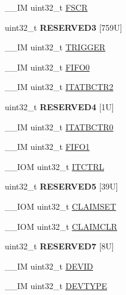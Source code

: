 \begin{DoxyCompactItemize}
\+\_\+\+\_\+\+IM uint32\+\_\+t \hyperlink{struct_t_p_i___type_a36370b2b0879b7b497f6dd854ba02873}{F\+S\+CR}
\item 
\mbox{\label{struct_t_p_i___type_a650f89ad335eff97db39beae568590a3}} 
uint32\+\_\+t {\bfseries R\+E\+S\+E\+R\+V\+E\+D3} \mbox{[}759\+U\mbox{]}
\item 
\+\_\+\+\_\+\+IM uint32\+\_\+t \hyperlink{struct_t_p_i___type_a5590387d8f44b477fd69951a737b0d7e}{T\+R\+I\+G\+G\+ER}
\item 
\+\_\+\+\_\+\+IM uint32\+\_\+t \hyperlink{struct_t_p_i___type_ace73d78eff029b698e11cd5cf3efaf94}{F\+I\+F\+O0}
\item 
\+\_\+\+\_\+\+IM uint32\+\_\+t \hyperlink{struct_t_p_i___type_a97fb8816ad001f4910de095aa17d9db5}{I\+T\+A\+T\+B\+C\+T\+R2}
\item 
\mbox{\label{struct_t_p_i___type_a1defe18fe95571e383d754b13d3f6c51}} 
uint32\+\_\+t {\bfseries R\+E\+S\+E\+R\+V\+E\+D4} \mbox{[}1\+U\mbox{]}
\item 
\+\_\+\+\_\+\+IM uint32\+\_\+t \hyperlink{struct_t_p_i___type_a9954c088735caa505adc113f6c64d812}{I\+T\+A\+T\+B\+C\+T\+R0}
\item 
\+\_\+\+\_\+\+IM uint32\+\_\+t \hyperlink{struct_t_p_i___type_abad7737b3d46cc6d4813d37171d29745}{F\+I\+F\+O1}
\item 
\+\_\+\+\_\+\+I\+OM uint32\+\_\+t \hyperlink{struct_t_p_i___type_ae6b7f224b1c19c636148f991cc8db611}{I\+T\+C\+T\+RL}
\item 
\mbox{\label{struct_t_p_i___type_ae024db200dd6038b38de69abd513f40c}} 
uint32\+\_\+t {\bfseries R\+E\+S\+E\+R\+V\+E\+D5} \mbox{[}39\+U\mbox{]}
\item 
\+\_\+\+\_\+\+I\+OM uint32\+\_\+t \hyperlink{struct_t_p_i___type_a974d17c9a0b0b1b894e9707d158b0fbe}{C\+L\+A\+I\+M\+S\+ET}
\item 
\+\_\+\+\_\+\+I\+OM uint32\+\_\+t \hyperlink{struct_t_p_i___type_a1f74caab7b0a7afa848c63ce8ebc6a6f}{C\+L\+A\+I\+M\+C\+LR}
\item 
\mbox{\label{struct_t_p_i___type_a49f51f1c090eb2cda74363bbfc3b385b}} 
uint32\+\_\+t {\bfseries R\+E\+S\+E\+R\+V\+E\+D7} \mbox{[}8\+U\mbox{]}
\item 
\+\_\+\+\_\+\+IM uint32\+\_\+t \hyperlink{struct_t_p_i___type_aaed316dacef669454fa035e04ee90eca}{D\+E\+V\+ID}
\item 
\+\_\+\+\_\+\+IM uint32\+\_\+t \hyperlink{struct_t_p_i___type_a81f643aff0e4bed2638a618e2b1fd3bb}{D\+E\+V\+T\+Y\+PE}
\end{DoxyCompactItemize}


